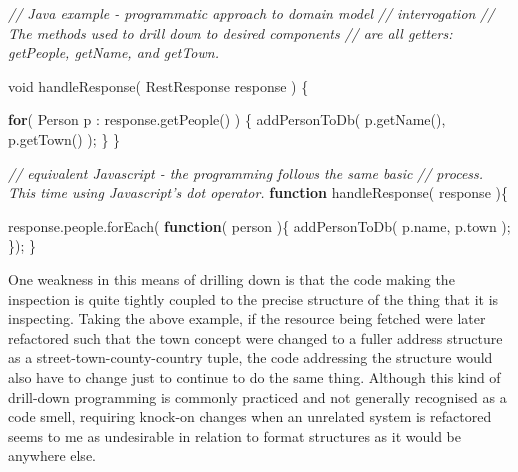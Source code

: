 \documentclass[12pt, ]{article}
\newenvironment{Shaded}{}{}
\newcommand{\KeywordTok}[1]{\textcolor[rgb]{0.00,0.44,0.13}{\textbf{{#1}}}}
\newcommand{\DataTypeTok}[1]{\textcolor[rgb]{0.56,0.13,0.00}{{#1}}}
\newcommand{\CommentTok}[1]{\textcolor[rgb]{0.38,0.63,0.69}{\textit{{#1}}}}
\newcommand{\OtherTok}[1]{\textcolor[rgb]{0.00,0.44,0.13}{{#1}}}
\newcommand{\FunctionTok}[1]{\textcolor[rgb]{0.02,0.16,0.49}{{#1}}}
\newcommand{\NormalTok}[1]{{#1}}
\begin{document}
\begin{Shaded}
\begin{Highlighting}[]
\CommentTok{// Java example - programmatic approach to domain model }
\CommentTok{// interrogation}
\CommentTok{// The methods used to drill down to desired components }
\CommentTok{// are all getters: getPeople, getName, and getTown.}
 
\DataTypeTok{void} \FunctionTok{handleResponse}\NormalTok{( RestResponse response ) \{}

   \KeywordTok{for}\NormalTok{( Person p : response.}\FunctionTok{getPeople}\NormalTok{() ) \{}
      \FunctionTok{addPersonToDb}\NormalTok{( p.}\FunctionTok{getName}\NormalTok{(), p.}\FunctionTok{getTown}\NormalTok{() );}
   \NormalTok{\}   }
\NormalTok{\}}
\end{Highlighting}
\end{Shaded}

\begin{Shaded}
\begin{Highlighting}[]
\CommentTok{// equivalent Javascript - the programming follows the same basic}
\CommentTok{// process. This time using Javascript's dot operator.}
\KeywordTok{function} \FunctionTok{handleResponse}\NormalTok{( response )\{}

   \OtherTok{response}\NormalTok{.}\OtherTok{people}\NormalTok{.}\FunctionTok{forEach}\NormalTok{( }\KeywordTok{function}\NormalTok{( person )\{}
      \FunctionTok{addPersonToDb}\NormalTok{( }\OtherTok{p}\NormalTok{.}\FunctionTok{name}\NormalTok{, }\OtherTok{p}\NormalTok{.}\FunctionTok{town} \NormalTok{);}
   \NormalTok{\});}
\NormalTok{\}}
\end{Highlighting}
\end{Shaded}

One weakness in this means of drilling down is that the code making the
inspection is quite tightly coupled to the precise structure of the
thing that it is inspecting. Taking the above example, if the resource
being fetched were later refactored such that the town concept were
changed to a fuller address structure as a street-town-county-country
tuple, the code addressing the structure would also have to change just
to continue to do the same thing. Although this kind of drill-down
programming is commonly practiced and not generally recognised as a code
smell, requiring knock-on changes when an unrelated system is refactored
seems to me as undesirable in relation to format structures as it would
be anywhere else.
\end{document}
